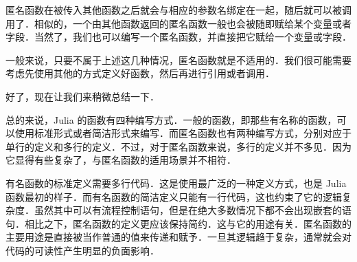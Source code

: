 匿名函数在被传入其他函数之后就会与相应的参数名绑定在一起，随后就可以被调用了．相似的，一个由其他函数返回的匿名函数一般也会被随即赋给某个变量或者字段．当然了，我们也可以编写一个匿名函数，并直接把它赋给一个变量或字段．

一般来说，只要不属于上述这几种情况，匿名函数就是不适用的．我们很可能需要考虑先使用其他的方式定义好函数，然后再进行引用或者调用．

好了，现在让我们来稍微总结一下．

总的来说，Julia 的函数有四种编写方式．一般的函数，即那些有名称的函数，可以使用标准形式或者简洁形式来编写．而匿名函数也有两种编写方式，分别对应于单行的定义和多行的定义．不过，对于匿名函数来说，多行的定义并不多见．因为它显得有些复杂了，与匿名函数的适用场景并不相符．

有名函数的标准定义需要多行代码．这是使用最广泛的一种定义方式，也是 Julia 函数最初的样子．而有名函数的简洁定义只能有一行代码，这也约束了它的逻辑复杂度．虽然其中可以有流程控制语句，但是在绝大多数情况下都不会出现嵌套的语句．相比之下，匿名函数的定义更应该保持简约．这与它的用途有关．匿名函数的主要用途是直接被当作普通的值来传递和赋予．一旦其逻辑趋于复杂，通常就会对代码的可读性产生明显的负面影响．